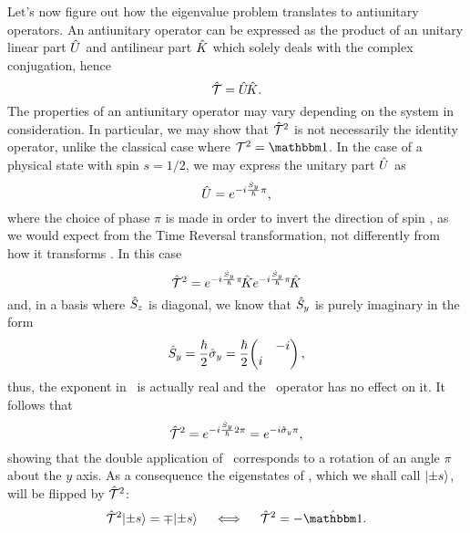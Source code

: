             Let's now figure out how the eigenvalue problem translates to antiunitary operators. An antiunitary operator can be expressed \cite{Sakurai2020-pu} as the product of an unitary linear part $\hat{U}$ and antilinear part $\hat{K}$ which solely deals with the complex conjugation, hence
            \begin{equation}
                \label{eq:antiunitary-operator}
                \mathcal{\hat{T}} = \hat{U}\!\hat{K}
                \text{.}
            \end{equation}
            The properties of an antiunitary operator may vary depending on the system in consideration. In particular, we may show that $\mathcal{\hat{T}}^2$ is not necessarily the identity operator, unlike the classical case where $\mcT^2 = \idM$. In the case of a physical state with spin $s = 1/2$, we may express the unitary part $\hat{U}$ as
            \begin{equation*}
                \hat{U} = e^{-i \frac{\hat{S}_y}{\hbar} \pi}
                \text{,}
            \end{equation*}
            where the choice of phase $\pi$ is made in order to invert the direction of spin \hvS, as we would expect from the Time Reversal transformation, not differently from how it transforms \hvp. In this case
            \begin{equation*}
                \mathcal{\hat{T}}^2 = e^{-i \frac{\hat{S}_y}{\hbar} \pi}\! \hat{K} e^{-i \frac{\hat{S}_y}{\hbar} \pi}\! \hat{K}
            \end{equation*}
            and, in a basis where $\hat{S}_z$ is diagonal, we know that $\hat{S}_y$ is purely imaginary in  the form
            \begin{equation*}
                \hSy
                = \frac{\hbar}{2} \togglehat{\sigma}_y
                = \frac{\hbar}{2} \!\pmqty{\admat{-i,i}}
                \mycomma
            \end{equation*}
            thus, the exponent in \hU\ is actually real and the \hK\ operator has no effect on it. It follows that
            \begin{equation*}
                \mathcal{\hat{T}}^2
                = e^{-i \frac{\hat{S}_y}{\hbar} 2\pi}
                = e^{-i \hat{\sigma}_y \pi}
                \text{,}
            \end{equation*}
            showing that the double application of \hT\ corresponds to a rotation of an angle $\pi$ about the $y$ axis. As a consequence the eigenstates of \hSz, which we shall call $\ket{\pm s}$, will be flipped by $\mathcal{\hat{T}}^2$:
            \begin{equation*}
                \hT^2 \!\ket{\pm s} = \mp\! \ket{\pm s}
                \quad\iff\quad
                \hT^2 = -\togglehat{\idM}
                \myperiod
            \end{equation*}
